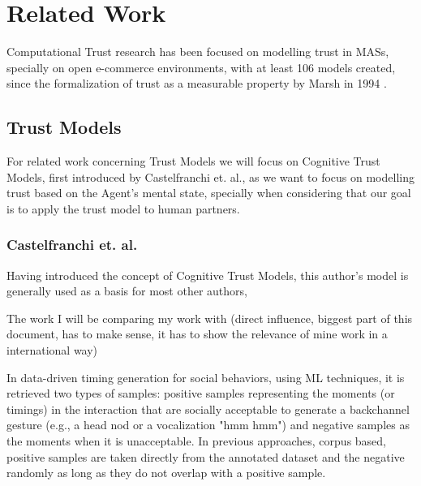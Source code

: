 

\section{Related Work}
\label{sec:Related Work}
Computational Trust research has been focused on modelling trust in \acp{MAS}, specially on open e-commerce environments\cite{Granatyr2015, HanYu2013, Pinyol2013, Noorian2010, Huang2008}, with at least 106 models created\cite{Granatyr2015}, since the formalization of trust as a measurable property by Marsh in 1994 \cite{Marsh1994}.

\subsection{Trust Models}
\label{subsec:Related work:Trust Models}
For related work concerning Trust Models we will focus on Cognitive Trust Models, first introduced by Castelfranchi et. al.\cite{Castelfranchi1998}, as we want to focus on modelling trust based on the Agent's mental state, specially when considering that our goal is to apply the trust model to human partners.

\subsubsection{Castelfranchi et. al.}
Having introduced the concept of Cognitive Trust Models, this author's model is generally used as a basis for most other authors, %


The work I will be comparing my work with (direct influence, biggest part of this document, has to make sense, it has to show the relevance of mine work in a international way)


In data-driven timing generation for social behaviors, using \ac{ML} techniques, it is retrieved two types of samples: positive samples representing the moments (or timings) in the interaction that are socially acceptable to generate a backchannel gesture (e.g., a head nod or a vocalization "hmm hmm") and negative samples as the moments when it is unacceptable. In previous approaches, corpus based, positive samples are taken directly from the annotated dataset and the negative randomly as long as they do not overlap with a positive sample. 



